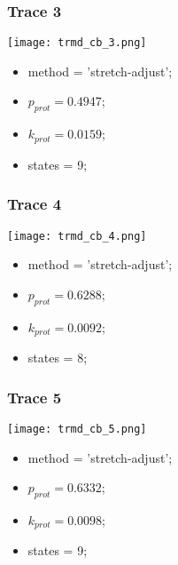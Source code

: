 \subsubsection{Trace 3}
\begin{minipage}[c]{0.7\textwidth}
	\texttt{[image: trmd\_cb\_3.png]}
\end{minipage}
\hfill
\begin{minipage}[c]{0.45\textwidth}
	\begin{itemize}
		\item method = 'stretch-adjust';
		\item $p_{prot}=0.4947$;
		\item $k_{prot}=0.0159$;
		\item states = 9;
	\end{itemize}
\end{minipage}

\subsubsection{Trace 4}
\begin{minipage}[c]{0.7\textwidth}
	\texttt{[image: trmd\_cb\_4.png]}
\end{minipage}
\hfill
\begin{minipage}[c]{0.45\textwidth}
	\begin{itemize}
		\item method = 'stretch-adjust';
		\item $p_{prot}=0.6288$;
		\item $k_{prot}=0.0092$;
		\item states = 8;
	\end{itemize}
\end{minipage}

\subsubsection{Trace 5}
\begin{minipage}[c]{0.7\textwidth}
	\texttt{[image: trmd\_cb\_5.png]}
\end{minipage}
\hfill
\begin{minipage}[c]{0.45\textwidth}
	\begin{itemize}
		\item method = 'stretch-adjust';
		\item $p_{prot}=0.6332$;
		\item $k_{prot}=0.0098$;
		\item states = 9;
	\end{itemize}
\end{minipage}

